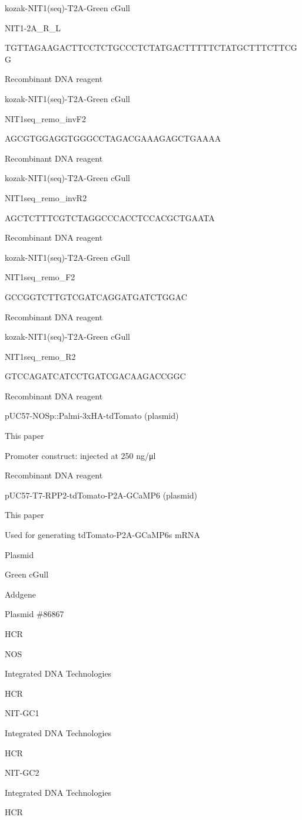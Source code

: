 \documentclass[
  10pt,
  onecolumn]{article}
\begin{document}
kozak-NIT1(seq)-T2A-Green cGull

NIT1-2A\_R\_L

TGTTAGAAGACTTCCTCTGCCCTCTATGACTTTTTCTATGCTTTCTTCGG

Recombinant DNA reagent

kozak-NIT1(seq)-T2A-Green cGull

NIT1seq\_remo\_invF2

AGCGTGGAGGTGGGCCTAGACGAAAGAGCTGAAAA

Recombinant DNA reagent

kozak-NIT1(seq)-T2A-Green cGull

NIT1seq\_remo\_invR2

AGCTCTTTCGTCTAGGCCCACCTCCACGCTGAATA

Recombinant DNA reagent

kozak-NIT1(seq)-T2A-Green cGull

NIT1seq\_remo\_F2

GCCGGTCTTGTCGATCAGGATGATCTGGAC

Recombinant DNA reagent

kozak-NIT1(seq)-T2A-Green cGull

NIT1seq\_remo\_R2

GTCCAGATCATCCTGATCGACAAGACCGGC

Recombinant DNA reagent

pUC57-NOSp::Palmi-3xHA-tdTomato (plasmid)

This paper

Promoter construct: injected at 250 ng/μl

Recombinant DNA reagent

pUC57-T7-RPP2-tdTomato-P2A-GCaMP6 (plasmid)

This paper

Used for generating tdTomato-P2A-GCaMP6s mRNA

Plasmid

Green cGull

Addgene

Plasmid \#86867

HCR

NOS

Integrated DNA Technologies

HCR

NIT-GC1

Integrated DNA Technologies

HCR

NIT-GC2

Integrated DNA Technologies

HCR
\end{document}

